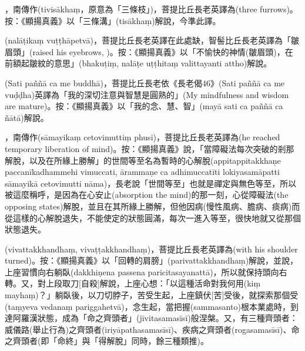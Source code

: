 \startitemgroup[noteitems]
\item{}，南傳作(tivisākhaṃ，原意為「三條枝」)，菩提比丘長老英譯為(three furrows)。按：《顯揚真義》以「三條溝」(tisākhaṃ)解說，今準此譯。
\stopitemgroup

\startitemgroup[noteitems]
\item{}(nalāṭikaṃ vuṭṭhāpetvā)，菩提比丘長老英譯在此處缺，智髻比丘長老英譯為「皺眉頭」(raised his eyebrows, )。按：《顯揚真義》以「不愉快的神情(皺眉頭)，在前額起皺紋的意思」(bhakuṭiṃ, nalāṭe uṭṭhitaṃ valittayanti attho)解說。
\stopitemgroup

\startitemgroup[noteitems]
\item{}(Sati paññā ca me buddhā)，菩提比丘長老依《長老偈46》(Sati paññā ca me vuḍḍha)英譯為「我的深切注意與智慧是圓熟的」(My mindfulness and wisdom are mature)。按：《顯揚真義》以「我的念、慧、智」(mayā sati ca paññā ca ñātā)解說。
\stopitemgroup

\startitemgroup[noteitems]
\item{}，南傳作(sāmayikaṃ cetovimuttiṃ phusi)，菩提比丘長老英譯為(he reached temporary liberation of mind)。按：《顯揚真義》說，「當障礙法每次突破的剎那解脫，以及在所緣上勝解」的世間等至名為暫時的心解脫(appitappitakkhaṇe paccanīkadhammehi vimuccati, ārammaṇe ca adhimuccatīti lokiyasamāpatti sāmayikā cetovimutti nāma)，長老說「世間等至」也就是禪定與無色等至，所以被這麼稱呼，是因為在心安止(absorption the mind)的那一刻，心從障礙法(the opposing states)解脫，並且在其所緣上勝解，但他因病(慢性風病、膽病、痰病)而從這樣的心解脫退失，不能使定的狀態圓滿，每次一進入等至，很快地就又從那個狀態退失。
\stopitemgroup

\startitemgroup[noteitems]
\item{}(vivattakkhandhaṃ, vivaṭṭakkhandhaṃ)，菩提比丘長老英譯為(with his shoulder turned)。按：《顯揚真義》以「回轉的肩膀」(parivattakkhandhaṃ)解說，並說，上座習慣向右躺臥(dakkhiṇena passena paricitasayanattā)，所以就保持頭向右轉。又，對上段取刀[自殺]解說，上座心想：「以這種活命對我何用(kiṃ mayhaṃ)？」躺臥後，以刀切脖子，苦受生起，上座鎮伏[苦]受後，就探索那個受(taṃyeva vedanaṃ pariggahetvā)，念生起，當把握(sammasanto)根本業處時，到達阿羅漢狀態，成為「命之齊頭者」(jīvitasamasīsī)般涅槃。又，有三種齊頭者：威儀路(舉止行為)之齊頭者(iriyāpathasamasīsī)、疾病之齊頭者(rogasamasīsī)、命之齊頭者(即「命終」與「得解脫」同時，餘三種類推)。
\stopitemgroup

